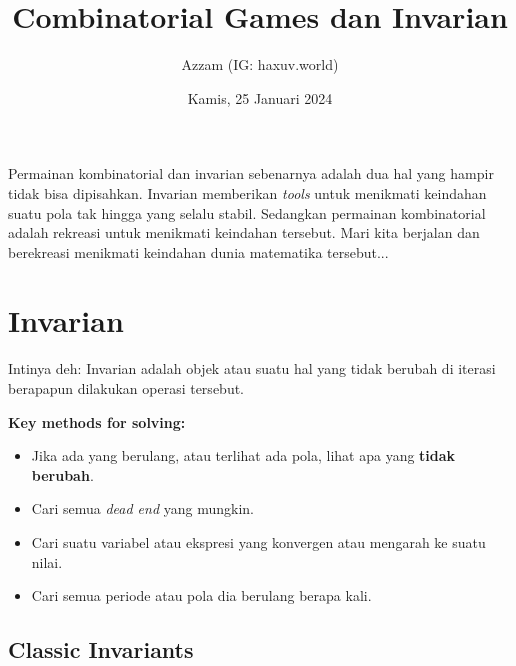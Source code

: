 \documentclass[12pt]{scrartcl}
\title{Combinatorial Games dan Invarian}
\author{Azzam (IG: haxuv.world)}
\date{Kamis, 25 Januari 2024}
\begin{document}
\maketitle

\renewcommand*\contentsname{Daftar Isi}
\tableofcontents

\newpage
Permainan kombinatorial dan invarian sebenarnya adalah dua hal yang hampir tidak bisa dipisahkan. Invarian memberikan \textit{tools} untuk menikmati keindahan suatu pola tak hingga yang selalu stabil. Sedangkan permainan kombinatorial adalah rekreasi untuk menikmati keindahan tersebut. Mari kita berjalan dan berekreasi menikmati keindahan dunia matematika tersebut...

\section{Invarian}
\begin{definition}
    Intinya deh: Invarian adalah objek atau suatu hal yang tidak berubah di iterasi berapapun dilakukan operasi tersebut.
\end{definition}
\textbf{Key methods for solving:}
\begin{itemize}
    \item Jika ada yang berulang, atau terlihat ada pola, lihat apa yang \textbf{tidak berubah}.
    \item Cari semua \textit{dead end} yang mungkin.
    \item Cari suatu variabel atau ekspresi yang konvergen atau mengarah ke suatu nilai.
    \item Cari semua periode atau pola dia berulang berapa kali.
\end{itemize}
\subsection{Classic Invariants}
\end{document}

